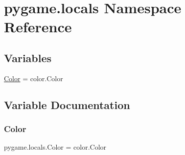 \hypertarget{namespacepygame_1_1locals}{}\section{pygame.\+locals Namespace Reference}
\label{namespacepygame_1_1locals}
\subsection*{Variables}
\begin{DoxyCompactItemize}
\item 
\hyperlink{namespacepygame_1_1locals_a874d7539a2dba988b82da922937cb3a0}{Color} = color.\+Color
\end{DoxyCompactItemize}


\subsection{Variable Documentation}
\mbox{\label{namespacepygame_1_1locals_a874d7539a2dba988b82da922937cb3a0}} 
\subsubsection{\texorpdfstring{Color}{Color}}
{\footnotesize\ttfamily pygame.\+locals.\+Color = color.\+Color}

